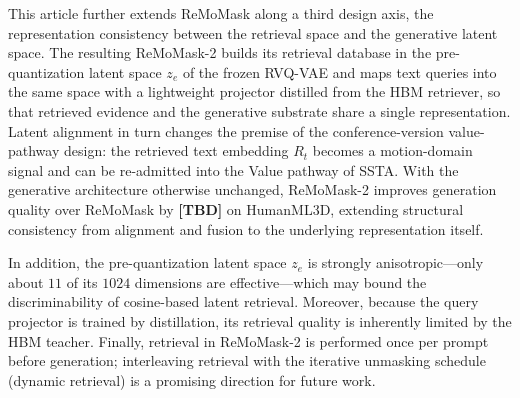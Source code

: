 This article further extends ReMoMask along a third design axis, the representation consistency between the retrieval space and the generative latent space. The resulting ReMoMask-2 builds its retrieval database in the pre-quantization latent space $z_e$ of the frozen RVQ-VAE and maps text queries into the same space with a lightweight projector distilled from the HBM retriever, so that retrieved evidence and the generative substrate share a single representation. Latent alignment in turn changes the premise of the conference-version value-pathway design: the retrieved text embedding $R_t$ becomes a motion-domain signal and can be re-admitted into the Value pathway of SSTA. With the generative architecture otherwise unchanged, ReMoMask-2 improves generation quality over ReMoMask by \textbf{[TBD]} on HumanML3D, extending structural consistency from alignment and fusion to the underlying representation itself.


In addition, the pre-quantization latent space $z_e$ is strongly anisotropic---only about $11$ of its $1024$ dimensions are effective---which may bound the discriminability of cosine-based latent retrieval. Moreover, because the query projector is trained by distillation, its retrieval quality is inherently limited by the HBM teacher. Finally, retrieval in ReMoMask-2 is performed once per prompt before generation; interleaving retrieval with the iterative unmasking schedule (dynamic retrieval) is a promising direction for future work.
